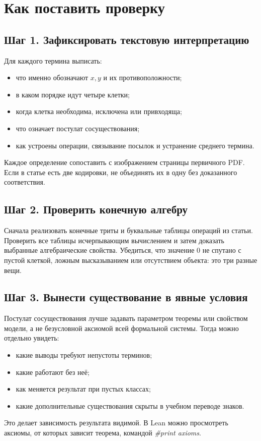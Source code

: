 \documentclass[12pt,a4paper]{article}
\begin{document}
\section{Как поставить проверку}

\subsection{Шаг 1. Зафиксировать текстовую интерпретацию}

Для каждого термина выписать:

\begin{itemize}
\item что именно обозначают \(x,y\) и их противоположности;
\item в каком порядке идут четыре клетки;
\item когда клетка необходима, исключена или привходяща;
\item что означает постулат сосуществования;
\item как устроены операции, связывание посылок и устранение среднего термина.
\end{itemize}
Каждое определение сопоставить с изображением страницы первичного PDF. Если в статье есть две кодировки, не объединять их в одну без доказанного соответствия.

\subsection{Шаг 2. Проверить конечную алгебру}

Сначала реализовать конечные триты и буквальные таблицы операций из статьи. Проверить все таблицы исчерпывающим вычислением и затем доказать выбранные алгебраические свойства. Убедиться, что значение \(0\) не спутано с пустой клеткой, ложным высказыванием или отсутствием объекта: это три разные вещи.

\subsection{Шаг 3. Вынести существование в явные условия}

Постулат сосуществования лучше задавать параметром теоремы или свойством модели, а не безусловной аксиомой всей формальной системы. Тогда можно отдельно увидеть:

\begin{itemize}
\item какие выводы требуют непустоты терминов;
\item какие работают без неё;
\item как меняется результат при пустых классах;
\item какие дополнительные существования скрыты в учебном переводе знаков.
\end{itemize}
Это делает зависимость результата видимой. В Lean можно просмотреть аксиомы, от которых зависит теорема, командой \emph{\#print axioms}.
\end{document}

